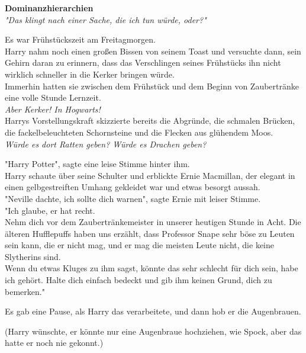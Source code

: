 

\hypertarget{dominanzhierarchien}{%

\textbf{Dominanzhierarchien}\\

\emph{"Das klingt nach einer Sache, die ich tun würde, oder?"}

Es war Frühstückszeit am Freitagmorgen.\\ Harry nahm noch einen großen Bissen von seinem Toast und versuchte dann, sein Gehirn daran zu erinnern, dass das Verschlingen seines Frühstücks ihn nicht wirklich schneller in die Kerker bringen würde.\\ Immerhin hatten sie zwischen dem Frühstück und dem Beginn von Zaubertränke eine volle Stunde Lernzeit.\\ \emph{Aber Kerker! In Hogwarts!}\\ Harrys Vorstellungskraft skizzierte bereits die Abgründe, die schmalen Brücken, die fackelbeleuchteten Schornsteine und die Flecken aus glühendem Moos.\\ \emph{Würde es dort Ratten geben? Würde es Drachen geben?}

"Harry Potter", sagte eine leise Stimme hinter ihm.\\ Harry schaute über seine Schulter und erblickte Ernie Macmillan, der elegant in einen gelbgestreiften Umhang gekleidet war und etwas besorgt aussah.\\ "Neville dachte, ich sollte dich warnen", sagte Ernie mit leiser Stimme.\\ "Ich glaube, er hat recht.\\ Nehm dich vor dem Zaubertränkemeister in unserer heutigen Stunde in Acht. Die älteren Hufflepuffs haben uns erzählt, dass Professor Snape sehr böse zu Leuten sein kann, die er nicht mag, und er mag die meisten Leute nicht, die keine Slytherins sind.\\ Wenn du etwas Kluges zu ihm sagst, könnte das sehr schlecht für dich sein, habe ich gehört. Halte dich einfach bedeckt und gib ihm keinen Grund, dich zu bemerken."

Es gab eine Pause, als Harry das verarbeitete, und dann hob er die Augenbrauen.

(Harry wünschte, er könnte nur eine Augenbraue hochziehen, wie Spock, aber das hatte er noch nie gekonnt.)

}

